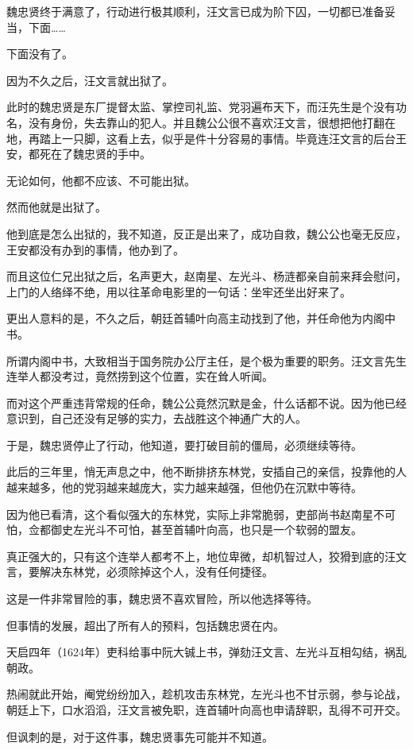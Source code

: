\begin{multicols}{\theparacolNo}
魏忠贤终于满意了，行动进行极其顺利，汪文言已成为阶下囚，一切都已准备妥当，下面……

下面没有了。

因为不久之后，汪文言就出狱了。

此时的魏忠贤是东厂提督太监、掌控司礼监、党羽遍布天下，而汪先生是个没有功名，没有身份，失去靠山的犯人。并且魏公公很不喜欢汪文言，很想把他打翻在地，再踏上一只脚，这看上去，似乎是件十分容易的事情。毕竟连汪文言的后台王安，都死在了魏忠贤的手中。

无论如何，他都不应该、不可能出狱。

然而他就是出狱了。

他到底是怎么出狱的，我不知道，反正是出来了，成功自救，魏公公也毫无反应，王安都没有办到的事情，他办到了。

而且这位仁兄出狱之后，名声更大，赵南星、左光斗、杨涟都亲自前来拜会慰问，上门的人络绎不绝，用以往革命电影里的一句话：坐牢还坐出好来了。

更出人意料的是，不久之后，朝廷首辅叶向高主动找到了他，并任命他为内阁中书。

所谓内阁中书，大致相当于国务院办公厅主任，是个极为重要的职务。汪文言先生连举人都没考过，竟然捞到这个位置，实在耸人听闻。

而对这个严重违背常规的任命，魏公公竟然沉默是金，什么话都不说。因为他已经意识到，自己还没有足够的实力，去战胜这个神通广大的人。

于是，魏忠贤停止了行动，他知道，要打破目前的僵局，必须继续等待。

此后的三年里，悄无声息之中，他不断排挤东林党，安插自己的亲信，投靠他的人越来越多，他的党羽越来越庞大，实力越来越强，但他仍在沉默中等待。

因为他已看清，这个看似强大的东林党，实际上非常脆弱，吏部尚书赵南星不可怕，佥都御史左光斗不可怕，甚至首辅叶向高，也只是一个软弱的盟友。

真正强大的，只有这个连举人都考不上，地位卑微，却机智过人，狡猾到底的汪文言，要解决东林党，必须除掉这个人，没有任何捷径。

这是一件非常冒险的事，魏忠贤不喜欢冒险，所以他选择等待。

但事情的发展，超出了所有人的预料，包括魏忠贤在内。

天启四年（1624年）吏科给事中阮大铖上书，弹劾汪文言、左光斗互相勾结，祸乱朝政。

热闹就此开始，阉党纷纷加入，趁机攻击东林党，左光斗也不甘示弱，参与论战，朝廷上下，口水滔滔，汪文言被免职，连首辅叶向高也申请辞职，乱得不可开交。

但讽刺的是，对于这件事，魏忠贤事先可能并不知道。


\end{multicols}
